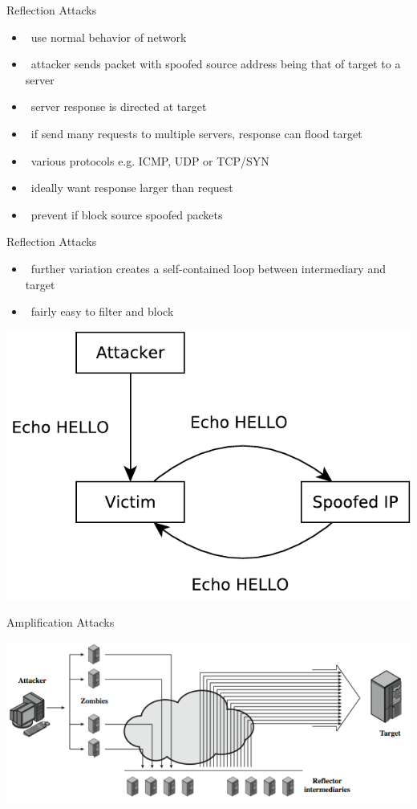 \documentclass{beamer}
\begin{document}
\begin{frame}{Reflection Attacks}
  \begin{itemize}
  \item  use normal behavior of network 
  \item  attacker sends packet with spoofed source 
    address being that of target to a server 
  \item  server response is directed at target 
  \item  if send many requests to multiple servers, 
    response can flood target 
  \item  various protocols e.g. ICMP, UDP or TCP/SYN 
  \item  ideally want response larger than request 
  \item  prevent if block source spoofed packets
  \end{itemize}
\end{frame}



\begin{frame}{Reflection Attacks }
  \begin{itemize}
  \item  further variation creates a self-contained loop 
    between intermediary and target 
  \item  fairly easy to filter and block
  \end{itemize}
  \begin{center}
  \includegraphics[width=0.6\linewidth]{reflection}
  \end{center}
\end{frame}

\begin{frame}{Amplification Attacks}
  \begin{center}
  \includegraphics[width=0.8\linewidth]{amplification}
  \end{center}
\end{frame}
\end{document}
